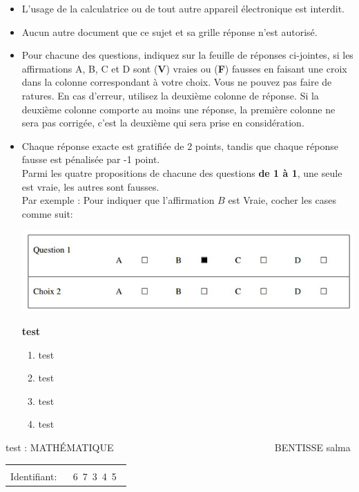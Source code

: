 \documentclass{book}%
\begin{document}
\begin{itemize}%
\item%
L'usage de la calculatrice ou de tout autre appareil électronique est interdit.%
\item%
Aucun autre document que ce sujet et sa grille réponse n'est autorisé.%
\item%
Pour chacune des questions, indiquez sur la feuille de réponses ci-jointes, si les affirmations A, B, C et D sont (\textbf{V}) vraies ou (\textbf{F}) fausses en faisant une croix dans la colonne correspondant à votre choix. Vous ne pouvez pas faire de ratures. En cas d'erreur, utilisez la deuxième colonne de réponse. Si la deuxième colonne comporte au moins une réponse, la première colonne ne sera pas corrigée, c'est la deuxième qui sera prise en considération.%
\item%
Chaque réponse exacte est gratifiée de 2 points, tandis que chaque réponse fausse est pénalisée par -1 point. \\ 	Parmi les quatre propositions de chacune des questions \textbf{de 1 à 1}, une seule est vraie, les autres sont fausses. \\ 	Par exemple : Pour indiquer que l'affirmation $B$ est Vraie, cocher les cases comme suit:  \\ \begin{center}	\includegraphics[scale=0.8]{reponses.png} \end{center}%
\thispagestyle{empty}%
\begin{exercise}%
\textbf{test }%
\begin{enumerate}[label=\textbf{\Alph*. }]%
\item%
test%
\item%
test%
\item%
test%
\item%
test%
\end{enumerate}%
\end{exercise}%
\end{itemize}%
\newpage%
\thispagestyle{empty}%
test : MATHÉMATIQUE $\qquad \qquad \qquad \qquad \qquad \qquad \qquad \qquad$ BENTISSE salma%
\begin{flushright}%
\begin{tabular}{|l|}%
\hline%
 \\%
\thispagestyle{empty}%
Identifiant: $\quad$ {\Large 6~7~3~4~5~}%
 \\%
\hline%
\end{tabular}%
\end{flushright}%
\end{document}
